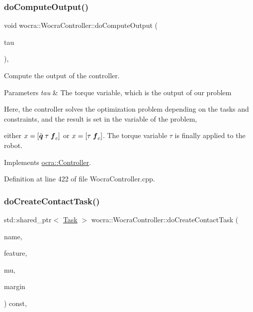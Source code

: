 \subsubsection{\texorpdfstring{do\+Compute\+Output()}{doComputeOutput()}}
{\footnotesize\ttfamily void wocra\+::\+Wocra\+Controller\+::do\+Compute\+Output (\begin{DoxyParamCaption}\item[{Eigen\+::\+Vector\+Xd \&}]{tau }\end{DoxyParamCaption})\hspace{0.3cm}{\ttfamily [protected]}, {\ttfamily [virtual]}}

Compute the output of the controller.


\begin{DoxyParams}{Parameters}
{\em tau} & The torque variable, which is the output of our problem\\
\hline
\end{DoxyParams}
Here, the controller solves the optimization problem depending on the tasks and constraints, and the result is set in the variable of the problem,

either $ x = [ \ddot{\mbox{\boldmath${q}$}} \; \tau \; \mbox{\boldmath${f}$}_c ] $ or $ x = [ \tau \; \mbox{\boldmath${f}$}_c ] $. The torque variable $ \tau $ is finally applied to the robot. 

Implements \hyperlink{classocra_1_1Controller_a8ca85413067d948459afa5981b3dda32}{ocra\+::\+Controller}.



Definition at line 422 of file Wocra\+Controller.\+cpp.

\hypertarget{classwocra_1_1WocraController_a60caf0250523856f915785efde7d2368}{}\label{classwocra_1_1WocraController_a60caf0250523856f915785efde7d2368} 
\subsubsection{\texorpdfstring{do\+Create\+Contact\+Task()}{doCreateContactTask()}}
{\footnotesize\ttfamily std\+::shared\+\_\+ptr$<$ \hyperlink{classocra_1_1Task}{Task} $>$ wocra\+::\+Wocra\+Controller\+::do\+Create\+Contact\+Task (\begin{DoxyParamCaption}\item[{const std\+::string \&}]{name,  }\item[{Point\+Contact\+Feature\+::\+Ptr}]{feature,  }\item[{double}]{mu,  }\item[{double}]{margin }\end{DoxyParamCaption}) const\hspace{0.3cm}{\ttfamily [protected]}, {\ttfamily [virtual]}}


